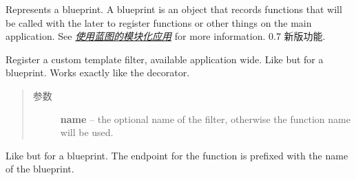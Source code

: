 \documentclass[a4paper,12pt]{sphinxmanual}
\begin{document}
\begin{fulllineitems}
\label{api:flask.Blueprint}
Represents a blueprint.  A blueprint is an object that records
functions that will be called with the
 later to register functions
or other things on the main application.  See {\hyperref[blueprints:blueprints]{\emph{使用蓝图的模块化应用}}} for more
information.
0.7 新版功能.

\begin{fulllineitems}
\label{api:flask.Blueprint.add_app_template_filter}
Register a custom template filter, available application wide.  Like
{\hyperref[api:flask.Flask.add_template_filter]{}} but for a blueprint.  Works exactly
like the {\hyperref[api:flask.Blueprint.app_template_filter]{}} decorator.
\begin{quote}\begin{description}
\item[{参数}] \leavevmode
\textbf{name} -- the optional name of the filter, otherwise the
function name will be used.

\end{description}\end{quote}

\end{fulllineitems}


\begin{fulllineitems}
\label{api:flask.Blueprint.add_url_rule}
Like {\hyperref[api:flask.Flask.add_url_rule]{}} but for a blueprint.  The endpoint for
the {\hyperref[api:flask.url_for]{}} function is prefixed with the name of the blueprint.

\end{fulllineitems}



\end{fulllineitems}
\end{document}
